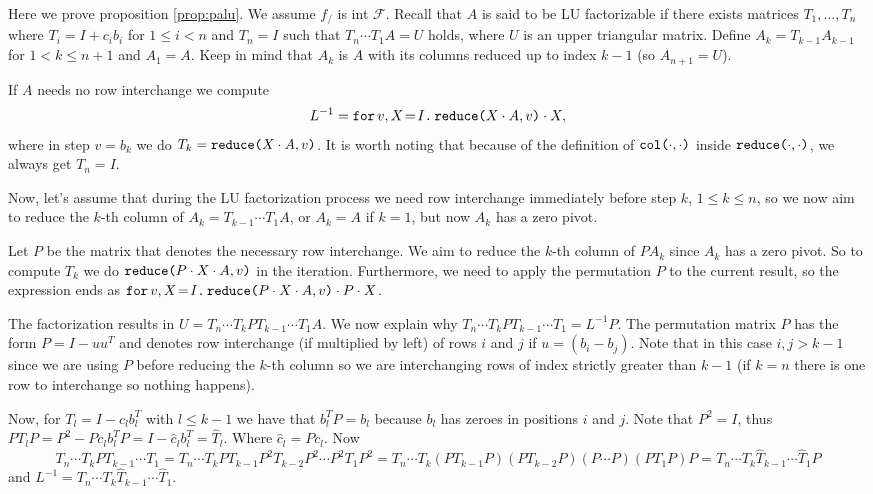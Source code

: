 Here we prove proposition \ref{prop:palu}. We assume $f_{/}$ is int $\mathcal{F}$. Recall that $A$ is said to be LU factorizable if there exists matrices $T_1,\ldots, T_{n}$ where $T_i=I+c_ib_i$ for $1\leq i < n$ and $T_n=I$ such that $T_{n}\cdots T_1A=U$ holds, where $U$ is an upper triangular matrix. Define $A_k=T_{k-1}A_{k-1}$ for $1< k\leq n+1$ and $A_1=A$. Keep in mind that $A_k$ is $A$ with its columns reduced up to index $k-1$ (so $A_{n+1}=U$). 

If $A$ needs no row interchange we compute $$L^{-1}=\initf{I}{v}{X}{\red{X\cdot A}{v}\cdot X},$$ where in step $v=b_k$ we do $T_k=\red{X\cdot A}{v}$. It is worth noting that because of the definition of $\ccol{\cdot}{\cdot}$ inside $\red{\cdot}{\cdot}$, we always get $T_n=I$.


Now, let's assume that during the LU factorization process we need row interchange immediately before step $k$, $1\leq k\leq n$, so we now aim to reduce the $k$-th column of $A_k=T_{k-1}\cdots T_1A$, or $A_k=A$ if $k=1$, but now $A_k$ has a zero pivot. 

Let $P$ be the matrix that denotes the necessary row interchange. We aim to reduce the $k$-th column of $PA_{k}$ since $A_{k}$ has a zero pivot. So to compute $T_k$ we do $\red{P\cdot X\cdot A}{v}$ in the iteration. Furthermore, we need to apply the permutation $P$ to the current result, so the expression ends as $\initf{I}{v}{X}{\red{P\cdot X\cdot A}{v}\cdot P\cdot X}$.

The factorization results in $U=T_{n}\cdots T_kPT_{k-1}\cdots T_1A$. We now explain why $T_{n}\cdots T_kPT_{k-1}\cdots T_1 = L^{-1}P.$ The permutation matrix $P$ has the form $P = I - uu^T$ and denotes row interchange (if multiplied by left) of rows $i$ and $j$ if $u=(b_{i}-b_{j})$. Note that in this case $i,j>k-1$ since we are using $P$ before reducing the $k$-th column so we are interchanging rows of index strictly greater than $k-1$ (if $k=n$ there is one row to interchange so nothing happens).

Now, for $T_{l}=I-c_lb_l^T$ with $l\leq k-1$ we have that $b_l^TP=b_l$ because $b_l$ has zeroes in positions $i$ and $j$. Note that $P^2=I$, thus $PT_lP=P^2-Pc_lb_l^TP=I-\widehat{c}_lb_l^T=\widehat{T}_l.$ Where $\widehat{c}_l=Pc_l$. Now $$T_{n}\cdots T_kPT_{k-1}\cdots T_1=T_{n}\cdots T_kPT_{k-1}P^2T_{k-2}P^2\cdots P^2 T_1P^2=T_{n}\cdots T_k(PT_{k-1}P)(PT_{k-2}P)(P\cdots P)(PT_1P)P=T_{n}\cdots T_k\widehat{T}_{k-1}\cdots \widehat{T}_1P$$ and $L^{-1} = T_{n}\cdots T_k\widehat{T}_{k-1}\cdots \widehat{T}_1$.

